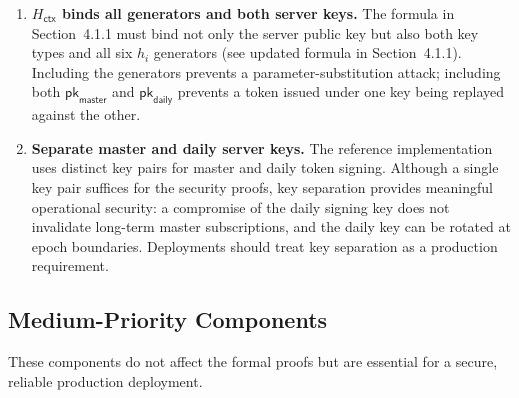 \documentclass[11pt]{article}
\theoremstyle{definitionstyle}
\theoremstyle{plain}
\begin{document}
\begin{enumerate}[leftmargin=*,label=\textbf{C\arabic*.}]
\item \textbf{$H_{\mathsf{ctx}}$ binds all generators and both server keys.}
  The formula in Section~4.1.1 must bind not only the server public key but
  also both key types and all six $h_i$ generators (see updated formula in
  Section~4.1.1).  Including the generators prevents a parameter-substitution
  attack; including both $\mathsf{pk}_{\mathsf{master}}$ and
  $\mathsf{pk}_{\mathsf{daily}}$ prevents a token issued under one key being
  replayed against the other.

\item \textbf{Separate master and daily server keys.}
  The reference implementation uses distinct key pairs for master and daily
  token signing.  Although a single key pair suffices for the security proofs,
  key separation provides meaningful operational security: a compromise of
  the daily signing key does not invalidate long-term master subscriptions,
  and the daily key can be rotated at epoch boundaries.  Deployments should
  treat key separation as a production requirement.

\end{enumerate}

\subsection{Medium-Priority Components}
\label{sec:medium}

These components do not affect the formal proofs but are essential for a
secure, reliable production deployment.
\end{document}
